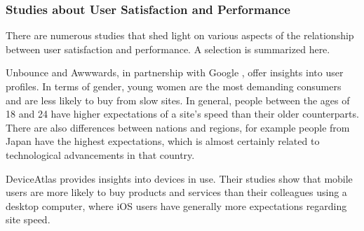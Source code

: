 \subsubsection{Studies about User Satisfaction and Performance}




There are numerous studies that shed light on various aspects of the relationship between user satisfaction and performance.
A selection is summarized here.

Unbounce \cite{2019Thinkfast} and Awwwards, in partnership with Google \cite{2017Brainfood}, offer insights into user profiles.
In terms of gender, young women are the most demanding consumers and are less likely to buy from slow sites.
In general, people between the ages of 18 and 24 have higher expectations of a site's speed than their older counterparts.
There are also differences between nations and regions, for example people from Japan have the highest expectations, which is almost certainly related to technological advancements in that country.



DeviceAtlas \cite{2019Deviceatlas} provides insights into devices in use.
Their studies show that mobile users are more likely to buy products and services than their colleagues using a desktop computer, where iOS users have generally more expectations regarding site speed.
 
